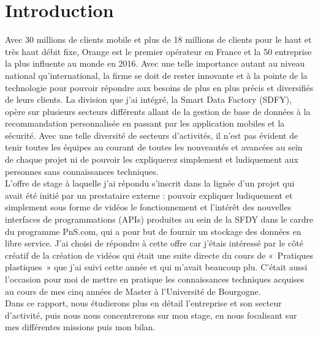 \chapter*{Introduction}
\label{chap:introduction}

Avec 30 millions de clients mobile et plus de 18 millions de clients  pour le haut et très haut débit fixe, Orange est le premier opérateur en France et la 50 entreprise la plus influente au monde en 2016. Avec une telle importance autant au niveau national qu'international, la firme se doit de rester innovante et à la pointe de la technologie pour pouvoir répondre aux besoins de plus en plus précis et diversifiés de leurs clients. La division que j’ai intégré, la Smart Data Factory (SDFY), opère sur plusieurs secteurs différents allant de la gestion de base de données à la recommandation personnalisée en passant par les application mobiles et la sécurité. Avec une telle diversité de secteurs d’activités, il n’est pas évident de tenir toutes les équipes au courant de toutes les nouveautés et avancées au sein de chaque projet ni de pouvoir les expliquerez simplement et ludiquement aux personnes sans connaissances techniques.\\
L’offre de stage à laquelle j’ai répondu s’inscrit dans la lignée d’un projet qui avait été initié par un prestataire externe : pouvoir expliquer ludiquement et simplement sous forme de vidéos le fonctionnement et l’intérêt des nouvelles  interfaces de programmations (APIs) produites au sein de la SFDY dans le cardre du programme PnS.com, qui a pour but de fournir un stockage des données en libre service. J’ai choisi de répondre à cette offre car j’étais intéressé par le côté créatif de la création de vidéos qui était une suite directe du cours de « Pratiques plastiques » que j’ai suivi cette année et qui m’avait beaucoup plu. C’était aussi l’occasion pour moi de mettre en pratique les connaissances techniques acquises au cours de mes cinq années de Master à l’Université de Bourgogne.\\
Dans ce rapport, nous étudierons plus en détail l’entreprise et son secteur d’activité, puis nous nous concentrerons sur mon stage, en nous focalisant sur mes différentes missions puis mon bilan.
